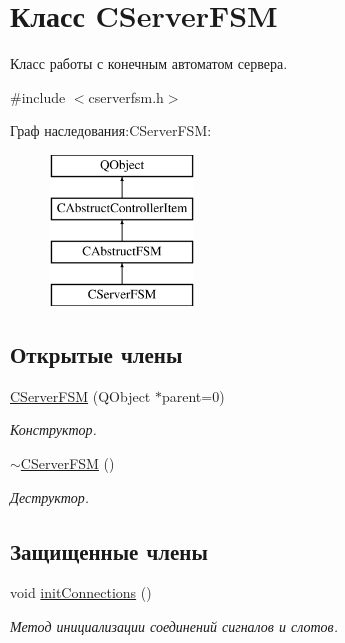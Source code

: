 \hypertarget{class_c_server_f_s_m}{}\section{Класс C\+Server\+F\+SM}
\label{class_c_server_f_s_m}


Класс работы с конечным автоматом сервера.  




{\ttfamily \#include $<$cserverfsm.\+h$>$}

Граф наследования\+:C\+Server\+F\+SM\+:\begin{figure}[H]
\begin{center}
\leavevmode
\includegraphics[height=4.000000cm]{class_c_server_f_s_m}
\end{center}
\end{figure}
\subsection*{Открытые члены}
\begin{DoxyCompactItemize}
\item 
\hyperlink{class_c_server_f_s_m_a6d2328de2b1e2725e4a569e146b077f3}{C\+Server\+F\+SM} (Q\+Object $\ast$parent=0)
\begin{DoxyCompactList}\small\item\em Конструктор. \end{DoxyCompactList}\item 
\hyperlink{class_c_server_f_s_m_a33dcbbf4680177c3f5769171f9516e8c}{$\sim$\+C\+Server\+F\+SM} ()
\begin{DoxyCompactList}\small\item\em Деструктор. \end{DoxyCompactList}\end{DoxyCompactItemize}
\subsection*{Защищенные члены}
\begin{DoxyCompactItemize}
\item 
void \hyperlink{class_c_server_f_s_m_ae0e6a994505c26e60b718af9989bea77}{init\+Connections} ()
\begin{DoxyCompactList}\small\item\em Метод инициализации соединений сигналов и слотов. \end{DoxyCompactList}\end{DoxyCompactItemize}
